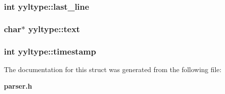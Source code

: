 \subsubsection{\setlength{\rightskip}{0pt plus 5cm}int yyltype::last\_\-line}\label{structyyltype_m3}


\subsubsection{\setlength{\rightskip}{0pt plus 5cm}char$\ast$ yyltype::text}\label{structyyltype_m5}


\subsubsection{\setlength{\rightskip}{0pt plus 5cm}int yyltype::timestamp}\label{structyyltype_m0}




The documentation for this struct was generated from the following file:\begin{CompactItemize}
\item 
{\bf parser.h}\end{CompactItemize}
